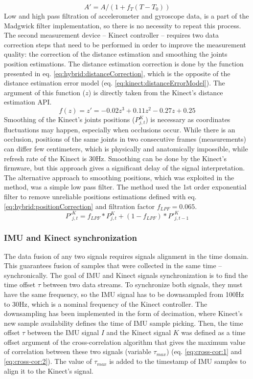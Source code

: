 \documentclass[sensors,article,submit,moreauthors,pdftex,10pt,a4paper]{mdpi}
\begin{document}
	\begin{equation}
		A'=A/(1+ f_T (T-T_0))
		\label{eq:hybrid:tempCorrection}
	\end{equation}
	Low and high pass filtration of accelerometer and gyroscope data, is a part of the Madgwick filter implementation, so there is no necessity to repeat this process.
	The second measurement device – Kinect controller – requires two data correction steps that need to be performed in order to improve the measurement quality: the correction of the distance estimation and smoothing the joints position estimations. The distance estimation correction is done by the function presented in eq. \ref{eq:hybrid:distanceCorrection}, which is the opposite of the distance estimation error model (eq. \ref{eq:kinect:distanceErrorModel}). The argument of this function ($z$) is directly taken from the Kinect’s distance estimation API.
	\begin{equation}
		f(z)=z'=-0.02z^3+0.11z^2-0.27z+0.25
		\label{eq:hybrid:distanceCorrection}
	\end{equation}
	Smoothing of the Kinect’s joints positions ($P_{j,t}^K$) is necessary as coordinates fluctuations may happen, especially when occlusions occur. While there is an occlusion, positions of the same joints in two consecutive frames (measurements) can differ few centimeters, which is physically and anatomically impossible, while refresh rate of the Kinect is 30Hz. Smoothing can be done by the Kinect’s firmware, but this approach gives a significant delay of the signal interpretation. The alternative approach to smoothing positions, which was exploited in the method, was a simple low pass filter. The method used the 1st order exponential filter to remove unreliable positions estimations defined with eq. \ref{eq:hybrid:positionCorrection} and filtration factor $f_{LPF} = 0.065$.
	\begin{equation}
		{P'}_{j,t}^K=f_{LPF} * P_{j,t}^K+(1-f_{LPF}) * {P'}_{j,t-1}^K
		\label{eq:hybrid:positionCorrection}
	\end{equation}
	
	\subsubsection{IMU and Kinect synchronization}
	The data fusion of any two signals requires signals alignment in the time domain. This guarantees fusion of samples that were collected in the same time -- synchronically. The goal of IMU and Kinect signals synchronization is to find the time offset $\tau$ between two data streams. To synchronize both signals, they must have the same frequency, so the IMU signal has to be downsampled from 100Hz to 30Hz, which is a nominal frequency of the Kinect controller. The downsampling has been implemented in the form of decimation, where Kinect’s new sample availability defines the time of IMU sample picking. Then, the time offset $\tau$ between the IMU signal $I$ and the Kinect signal $K$ was defined as a time offset argument of the cross-correlation algorithm that gives the maximum value of correlation between these two signals (variable $\tau_{max}$) (eq. \ref{eq:cross-cor:1} and \ref{eq:cross-cor:2}). The value of $\tau_{max}$ is added to the timestamp of IMU samples to align it to the Kinect’s signal.
	
\end{document}
